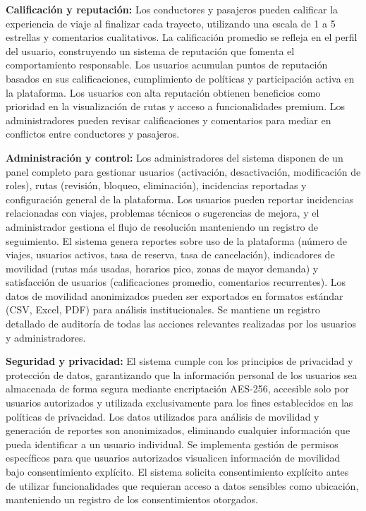 \documentclass[11pt,a4paper]{article}
\begin{document}
\textbf{Calificación y reputación: }Los conductores y pasajeros pueden calificar la experiencia de viaje al finalizar cada trayecto, utilizando una escala de 1 a 5 estrellas y comentarios cualitativos. La calificación promedio se refleja en el perfil del usuario, construyendo un sistema de reputación que fomenta el comportamiento responsable. Los usuarios acumulan puntos de reputación basados en sus calificaciones, cumplimiento de políticas y participación activa en la plataforma. Los usuarios con alta reputación obtienen beneficios como prioridad en la visualización de rutas y acceso a funcionalidades premium. Los administradores pueden revisar calificaciones y comentarios para mediar en conflictos entre conductores y pasajeros.

\textbf{Administración y control:} Los administradores del sistema disponen de un panel completo para gestionar usuarios (activación, desactivación, modificación de roles), rutas (revisión, bloqueo, eliminación), incidencias reportadas y configuración general de la plataforma. Los usuarios pueden reportar incidencias relacionadas con viajes, problemas técnicos o sugerencias de mejora, y el administrador gestiona el flujo de resolución manteniendo un registro de seguimiento. El sistema genera reportes sobre uso de la plataforma (número de viajes, usuarios activos, tasa de reserva, tasa de cancelación), indicadores de movilidad (rutas más usadas, horarios pico, zonas de mayor demanda) y satisfacción de usuarios (calificaciones promedio, comentarios recurrentes). Los datos de movilidad anonimizados pueden ser exportados en formatos estándar (CSV, Excel, PDF) para análisis institucionales. Se mantiene un registro detallado de auditoría de todas las acciones relevantes realizadas por los usuarios y administradores.

\textbf{Seguridad y privacidad:} El sistema cumple con los principios de privacidad y protección de datos, garantizando que la información personal de los usuarios sea almacenada de forma segura mediante encriptación AES-256, accesible solo por usuarios autorizados y utilizada exclusivamente para los fines establecidos en las políticas de privacidad. Los datos utilizados para análisis de movilidad y generación de reportes son anonimizados, eliminando cualquier información que pueda identificar a un usuario individual. Se implementa gestión de permisos específicos para que usuarios autorizados visualicen información de movilidad bajo consentimiento explícito. El sistema solicita consentimiento explícito antes de utilizar funcionalidades que requieran acceso a datos sensibles como ubicación, manteniendo un registro de los consentimientos otorgados.
\end{document}
